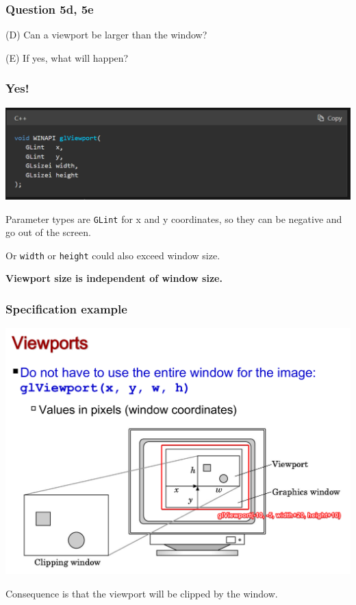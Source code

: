 \documentclass{beamer}
\begin{document}
\begin{frame}
    \frametitle{Question 5d, 5e}

    (D) Can a viewport be larger than the window? \\

    \vspace{1em}

    (E) If yes, what will happen?
\end{frame}

\begin{frame}
    \frametitle{Yes!}

    \begin{center}
        \includegraphics[scale=0.5]{glviewport.png}
    \end{center}

    Parameter types are \texttt{GLint} for x and y coordinates, so they can be negative and go out of the screen.\\

    \vspace{1em}

    Or \texttt{width} or \texttt{height} could also exceed window size.

    \textbf{Viewport size is independent of window size.}

\end{frame}

\begin{frame}
    \frametitle{Specification example}

    \begin{center}
        \includegraphics[scale=0.3]{viewport-window.png}
    \end{center}

    Consequence is that the viewport will be clipped by the window.
    
\end{frame}
\end{document}
